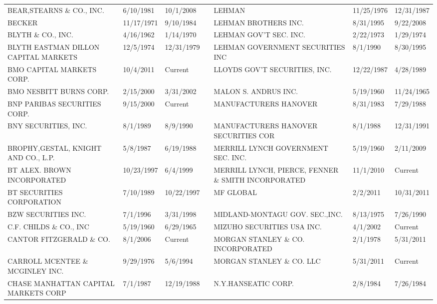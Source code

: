 \documentclass{article}
\begin{document}
\begin{adjustbox}{max width=\textwidth}
\begin{tabular}{lllllll}
BEAR,STEARNS \& CO., INC.            & 6/10/1981 & 10/1/2008 &  & LEHMAN                               & 11/25/1976 & 12/31/1987 \\
BECKER                               & 11/17/1971 & 9/10/1984 &  & LEHMAN BROTHERS INC.                 & 8/31/1995 & 9/22/2008 \\
BLYTH \& CO., INC.                    & 4/16/1962 & 1/14/1970 &  & LEHMAN GOV'T SEC. INC.               & 2/22/1973 & 1/29/1974 \\
BLYTH EASTMAN DILLON CAPITAL MARKETS & 12/5/1974 & 12/31/1979 &  & LEHMAN GOVERNMENT SECURITIES INC     & 8/1/1990 & 8/30/1995 \\
BMO CAPITAL MARKETS CORP.  & 10/4/2011 & Current &  & LLOYDS GOV'T SECURITIES, INC.       & 12/22/1987 & 4/28/1989 \\
BMO NESBITT BURNS CORP.             & 2/15/2000 & 3/31/2002 &  & MALON S. ANDRUS INC.                 & 5/19/1960 & 11/24/1965 \\
BNP PARIBAS SECURITIES CORP.         & 9/15/2000 & Current &  & MANUFACTURERS HANOVER                & 8/31/1983 & 7/29/1988 \\
BNY SECURITIES, INC.                 & 8/1/1989 & 8/9/1990 &  & MANUFACTURERS HANOVER SECURITIES COR & 8/1/1988 & 12/31/1991 \\
BROPHY,GESTAL, KNIGHT AND CO., L.P. & 5/8/1987 & 6/19/1988 &  & MERRILL LYNCH GOVERNMENT SEC. INC.  & 5/19/1960 & 2/11/2009 \\
BT ALEX. BROWN INCORPORATED          & 10/23/1997 & 6/4/1999 &  & MERRILL LYNCH, PIERCE, FENNER \& SMITH INCORPORATED & 11/1/2010 & Current \\
BT SECURITIES CORPORATION            & 7/10/1989 & 10/22/1997 &  & MF GLOBAL  & 2/2/2011 & 10/31/2011 \\
BZW SECURITIES INC.                  & 7/1/1996 & 3/31/1998 &  & MIDLAND-MONTAGU GOV. SEC.,INC.  & 8/13/1975 & 7/26/1990 \\
C.F. CHILDS \& CO., INC               & 5/19/1960 & 6/29/1965 &  & MIZUHO SECURITIES USA INC.          & 4/1/2002 & Current \\
CANTOR FITZGERALD \& CO. & 8/1/2006 & Current &  & MORGAN STANLEY \& CO. INCORPORATED   & 2/1/1978 & 5/31/2011 \\
CARROLL MCENTEE \& MCGINLEY INC.      & 9/29/1976 & 5/6/1994 &  & MORGAN STANLEY \& CO. LLC & 5/31/2011 & Current \\
CHASE MANHATTAN CAPITAL MARKETS CORP & 7/1/1987 & 12/19/1988 &  & N.Y.HANSEATIC CORP.             & 2/8/1984 & 7/26/1984 \\

\end{tabular}
\end{adjustbox}
\end{document}
